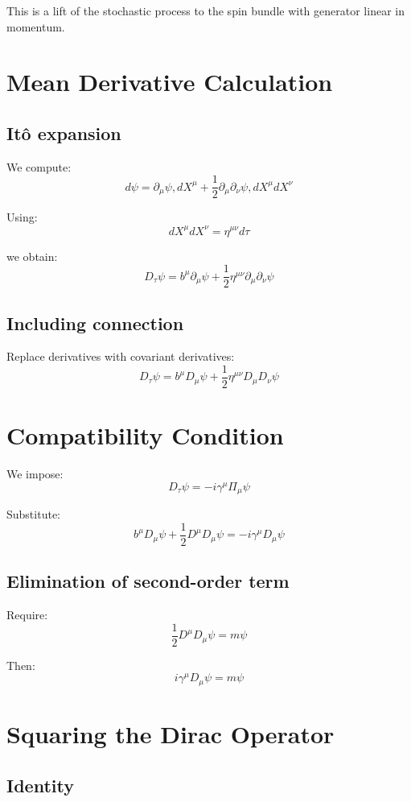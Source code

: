 \documentclass[11pt]{article}
\begin{document}
This is a lift of the stochastic process to the spin bundle with generator linear in momentum.

\section{Mean Derivative Calculation}

\subsection{It\^o expansion}

We compute:
\[
d\psi = \partial_\mu \psi , dX^\mu + \frac{1}{2} 
\partial_\mu \partial_\nu \psi , dX^\mu dX^\nu
\]

Using:
\[
dX^\mu dX^\nu = \eta^{\mu\nu} d\tau
\]

we obtain:
\[
D_\tau \psi = b^\mu \partial_\mu \psi + \frac{1}{2} \eta^{\mu\nu} 
\partial_\mu \partial_\nu \psi
\]

\subsection{Including connection}

Replace derivatives with covariant derivatives:
\[
D_\tau \psi = b^\mu D_\mu \psi + \frac{1}{2} \eta^{\mu\nu} D_\mu D_\nu \psi
\]

\section{Compatibility Condition}

We impose:
\[
D_\tau \psi = -i \gamma^\mu \Pi_\mu \psi
\]

Substitute:
\[
b^\mu D_\mu \psi + \frac{1}{2} D^\mu D_\mu \psi = -i \gamma^\mu D_\mu \psi
\]

\subsection{Elimination of second-order term}

Require:
\[
\frac{1}{2} D^\mu D_\mu \psi = m \psi
\]

Then:
\[
i \gamma^\mu D_\mu \psi = m \psi
\]

\section{Squaring the Dirac Operator}

\subsection{Identity}
\end{document}
